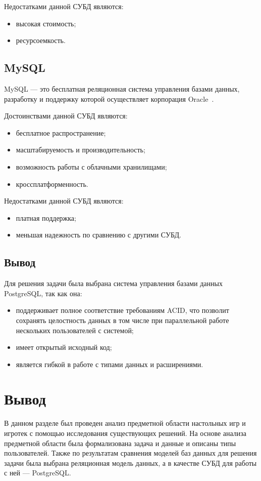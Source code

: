 Недостатками данной СУБД являются:
\begin{itemize}
    \item высокая стоимость;
    \item ресурсоемкость.
\end{itemize}

\subsection{MySQL}

MySQL --- это бесплатная реляционная система управления базами данных,
разработку и поддержку которой осуществляет корпорация Oracle~\cite{art06}.

Достоинствами данной СУБД являются:
\begin{itemize}
    \item бесплатное распространение;
    \item масштабируемость и производительность;
    \item возможность работы с облачными хранилищами;
    \item кроссплатформенность.
\end{itemize}

Недостатками данной СУБД являются:
\begin{itemize}
    \item платная поддержка;
    \item меньшая надежность по сравнению с другими СУБД.
\end{itemize}

\subsection*{Вывод}

Для решения задачи была выбрана система управления базами данных
PostgreSQL, так как она:

\begin{itemize}
    \item поддерживает полное соответствие требованиям ACID, что
позволит сохранять целостность данных в том числе при параллельной работе
нескольких пользователей с системой;
    \item имеет открытый исходный код;
    \item является гибкой в работе с типами данных и расширениями.
\end{itemize}

\section*{Вывод}

В данном разделе был проведен анализ предметной области настольных игр и игротек
с помощью исследования существующих решений. На основе анализа предметной
области была формализована задача и данные и описаны типы пользователей. Также
по результатам сравнения моделей баз данных для решения задачи была выбрана
реляционная модель данных, а в качестве СУБД для работы с ней --- PostgreSQL.
